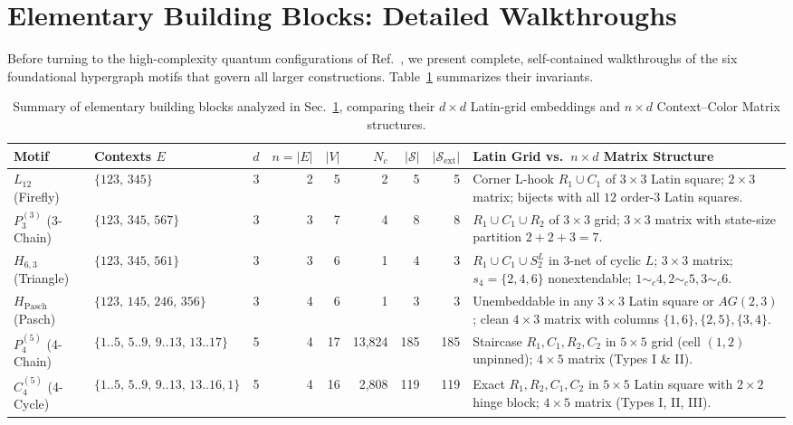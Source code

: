 \documentclass[aps,pra,reprint,superscriptaddress,longbibliography,nofootinbib,floatfix,10pt]{revtex4-2}
\theoremstyle{definition}\newtheorem{definition}[theorem]{Definition}
\theoremstyle{remark}\newtheorem{remark}[theorem]{Remark}
\newcommand{\Sc}{\mathcal S}\newcommand{\Cc}{\mathcal C}
\begin{document}
\section{Elementary Building Blocks: Detailed Walkthroughs}\label{sec:elementary}

Before turning to the high-complexity quantum configurations of Ref.~\cite{svozil-2025-color}, we present complete, self-contained walkthroughs of the six foundational hypergraph motifs that govern all larger constructions. Table~\ref{tab:elementary-summary} summarizes their invariants.

\begin{table}[t]
\centering\footnotesize\setlength{\tabcolsep}{3.5pt}
\caption{Summary of elementary building blocks analyzed in Sec.~\ref{sec:elementary}, comparing their $d\times d$ Latin-grid embeddings and $n\times d$ Context--Color Matrix structures.}\label{tab:elementary-summary}
\begin{tabular}{llrrrrrrp{}}\toprule
Motif & Contexts $E$ & $d$ & $n=|E|$ & $|V|$ & $N_c$ & $|\Sc|$ & $|\Sc_{\mathrm{ext}}|$ & Latin Grid vs.\ $n\times d$ Matrix Structure\\\midrule
$L_{12}$ (Firefly) & $\{123,\,345\}$ & 3 & 2 & 5 & 2 & 5 & 5 & Corner L-hook $R_1\cup C_1$ of $3\times 3$ Latin square; $2\times 3$ matrix; bijects with all $12$ order-$3$ Latin squares.\\
$P_3^{(3)}$ (3-Chain) & $\{123,\,345,\,567\}$ & 3 & 3 & 7 & 4 & 8 & 8 & $R_1\cup C_1\cup R_2$ of $3\times 3$ grid; $3\times 3$ matrix with state-size partition $2+2+3=7$.\\
$H_{6,3}$ (Triangle) & $\{123,\,345,\,561\}$ & 3 & 3 & 6 & 1 & 4 & 3 & $R_1\cup C_1\cup S_2^L$ in $3$-net of cyclic $L$; $3\times 3$ matrix; $s_4=\{2,4,6\}$ nonextendable; $1\sim_c 4,2\sim_c 5,3\sim_c 6$.\\
$H_{\mathrm{Pasch}}$ (Pasch) & $\{123,\,145,\,246,\,356\}$ & 3 & 4 & 6 & 1 & 3 & 3 & Unembeddable in any $3\times 3$ Latin square or $AG(2,3)$; clean $4\times 3$ matrix with columns $\{1,6\},\{2,5\},\{3,4\}$.\\
$P_4^{(5)}$ (4-Chain) & $\{1..5,\,5..9,\,9..13,\,13..17\}$ & 5 & 4 & 17 & 13,824 & 185 & 185 & Staircase $R_1,C_1,R_2,C_2$ in $5\times 5$ grid (cell $(1,2)$ unpinned); $4\times 5$ matrix (Types I \& II).\\
$C_4^{(5)}$ (4-Cycle) & $\{1..5,\,5..9,\,9..13,\,13..16,1\}$ & 5 & 4 & 16 & 2,808 & 119 & 119 & Exact $R_1,R_2,C_1,C_2$ in $5\times 5$ Latin square with $2\times 2$ hinge block; $4\times 5$ matrix (Types I, II, III).\\
\bottomrule\end{tabular}
\end{table}
\end{document}
